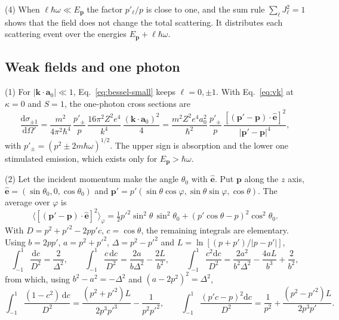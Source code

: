 \documentclass[11pt]{article}
\numberwithin{equation}{section}
\newcommand{\ehat}{\hat{\mathbf e}}
\newcommand{\av}{\mathbf a_0}
\newcommand{\kv}{\mathbf k}
\newcommand{\pv}{\mathbf p}
\newcommand{\dd}{\mathrm d}
\begin{document}
{\noindent}(4) When $\ell\hbar\omega\ll E_{\pv}$ the factor $p'_\ell/p$ is close to
one, and the sum rule $\sum_\ell J_\ell^2=1$ shows that the field does not
change the total scattering. It distributes each scattering event over the
energies $E_{\pv}+\ell\hbar\omega$.

\subsection{Weak fields and one photon}
\label{sec:onephoton}
{\noindent}(1) For $|\kv\cdot\av|\ll1$, Eq.~\eqref{eq:bessel-small} keeps
$\ell=0,\pm1$. With Eq.~\eqref{eq:vk} at $\kappa=0$ and $S=1$, the one-photon
cross sections are
\begin{equation}
\frac{\dd\sigma_{\pm1}}{\dd\Omega'}=\frac{m^2}{4\pi^2\hbar^4}\,\frac{p'_\pm}{p}\,
\frac{16\pi^2Z^2e^4}{k^4}\,\frac{(\kv\cdot\av)^2}{4}
=\frac{m^2Z^2e^4a_0^2}{\hbar^2}\,\frac{p'_\pm}{p}\,
\frac{[(\pv'-\pv)\cdot\ehat]^2}{|\pv'-\pv|^4},
\label{eq:one-photon}
\end{equation}
with $p'_\pm=(p^2\pm2m\hbar\omega)^{1/2}$. The upper sign is absorption and the
lower one stimulated emission, which exists only for $E_{\pv}>\hbar\omega$.

{\noindent}(2) Let the incident momentum make the angle $\theta_0$ with
$\ehat$. Put $\pv$ along the $z$ axis, $\ehat=(\sin\theta_0,0,\cos\theta_0)$ and
$\pv'=p'(\sin\theta\cos\varphi,\sin\theta\sin\varphi,\cos\theta)$. The average
over $\varphi$ is
\begin{equation}
\big\langle[(\pv'-\pv)\cdot\ehat]^2\big\rangle_\varphi=\tfrac12p'^2\sin^2\theta\,\sin^2\theta_0
+(p'\cos\theta-p)^2\cos^2\theta_0.
\end{equation}
With $D=p^2+p'^2-2pp'c$, $c=\cos\theta$, the remaining integrals are
elementary. Using $b=2pp'$, $a=p^2+p'^2$, $\Delta=p^2-p'^2$ and
$L=\ln[(p+p')/|p-p'|]$,
\begin{equation}
\int_{-1}^1\frac{\dd c}{D^2}=\frac{2}{\Delta^2},\qquad
\int_{-1}^1\frac{c\,\dd c}{D^2}=\frac{2a}{b\Delta^2}-\frac{2L}{b^2},\qquad
\int_{-1}^1\frac{c^2\dd c}{D^2}=\frac{2a^2}{b^2\Delta^2}-\frac{4aL}{b^3}+\frac{2}{b^2},
\end{equation}
from which, using $b^2-a^2=-\Delta^2$ and $(a-2p^2)^2=\Delta^2$,
\begin{equation}
\int_{-1}^1\frac{(1-c^2)\,\dd c}{D^2}=\frac{(p^2+p'^2)L}{2p^3p'^3}-\frac{1}{p^2p'^2},\qquad
\int_{-1}^1\frac{(p'c-p)^2\dd c}{D^2}=\frac{1}{p^2}+\frac{(p^2-p'^2)L}{2p^3p'}.
\end{equation}
\end{document}
